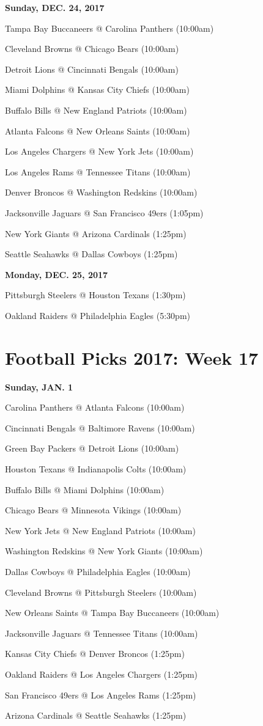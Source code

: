 \documentclass[11pt, letterpaper]{article}
\begin{document}
\noindent \normalsize \textbf{Sunday, DEC. 24, 2017} \par
Tampa Bay Buccaneers @ Carolina Panthers (10:00am)\par
Cleveland Browns @ Chicago Bears (10:00am)\par
Detroit Lions @ Cincinnati Bengals (10:00am)\par
Miami Dolphins @ Kansas City Chiefs (10:00am)\par
Buffalo Bills @ New England Patriots (10:00am)\par
Atlanta Falcons @ New Orleans Saints (10:00am)\par
Los Angeles Chargers @ New York Jets (10:00am)\par
Los Angeles Rams @ Tennessee Titans (10:00am)\par
Denver Broncos @ Washington Redskins (10:00am)\par
Jacksonville Jaguars @ San Francisco 49ers (1:05pm)\par
New York Giants @ Arizona Cardinals (1:25pm)\par
Seattle Seahawks @ Dallas Cowboys (1:25pm)\par
\noindent \normalsize \textbf{Monday, DEC. 25, 2017} \par
Pittsburgh Steelers @ Houston Texans (1:30pm)\par
Oakland Raiders @ Philadelphia Eagles (5:30pm)\par
\newpage \section*{\LARGE Football Picks 2017: Week 17}
\noindent \normalsize \textbf{Sunday, JAN. 1} \par
Carolina    Panthers @ Atlanta Falcons (10:00am)\par
Cincinnati Bengals @ Baltimore Ravens (10:00am)\par
Green Bay Packers @ Detroit Lions (10:00am)\par
Houston Texans @ Indianapolis Colts (10:00am)\par
Buffalo Bills @ Miami Dolphins (10:00am)\par
Chicago Bears @ Minnesota Vikings (10:00am)\par
New York Jets @ New England Patriots (10:00am)\par
Washington Redskins @ New York Giants (10:00am)\par
Dallas Cowboys @ Philadelphia Eagles (10:00am)\par
Cleveland Browns @ Pittsburgh Steelers (10:00am)\par
New Orleans Saints @ Tampa Bay Buccaneers (10:00am)\par
Jacksonville Jaguars @ Tennessee Titans (10:00am)\par
Kansas City Chiefs @ Denver Broncos (1:25pm)\par
Oakland Raiders @ Los Angeles Chargers (1:25pm)\par
San Francisco 49ers @ Los Angeles Rams (1:25pm)\par
Arizona Cardinals @ Seattle Seahawks (1:25pm)\par
\end{document}
